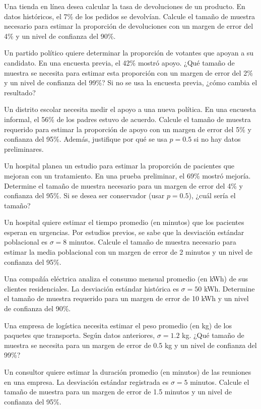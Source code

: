 \documentclass[addpoints,12pt]{exam}
\theoremstyle{plain}
\theoremstyle{remark}
\theoremstyle{definition}
\begin{document}
\begin{questions}
 \question Una tienda en línea desea calcular la tasa de devoluciones de un producto. En datos históricos, el 7\% de los pedidos se devolvían. Calcule el tamaño de muestra necesario para estimar la proporción de devoluciones con un margen de error del 4\% y un nivel de confianza del 90\%.  

 \question Un partido político quiere determinar la proporción de votantes que apoyan a su candidato. En una encuesta previa, el 42\% mostró apoyo. ¿Qué tamaño de muestra se necesita para estimar esta proporción con un margen de error del 2\% y un nivel de confianza del 99\%? Si no se usa la encuesta previa, ¿cómo cambia el resultado?  

 \question Un distrito escolar necesita medir el apoyo a una nueva política. En una encuesta informal, el 56\% de los padres estuvo de acuerdo. Calcule el tamaño de muestra requerido para estimar la proporción de apoyo con un margen de error del 5\% y confianza del 95\%. Además, justifique por qué se usa \( p = 0.5 \) si no hay datos preliminares.  

 \question Un hospital planea un estudio para estimar la proporción de pacientes que mejoran con un tratamiento. En una prueba preliminar, el 69\% mostró mejoría.  Determine el tamaño de muestra necesario para un margen de error del 4\% y confianza del 95\%. Si se desea ser conservador (usar \( p = 0.5 \)), ¿cuál sería el tamaño?  


 \question Un hospital quiere estimar el tiempo promedio (en minutos) que los pacientes esperan en urgencias. Por estudios previos, se sabe que la desviación estándar poblacional es \(\sigma = 8\) minutos. Calcule el tamaño de muestra necesario para estimar la media poblacional con un margen de error de 2 minutos y un nivel de confianza del 95\%.  

 \question  Una compañía eléctrica analiza el consumo mensual promedio (en kWh) de sus clientes residenciales. La desviación estándar histórica es \(\sigma = 50\) kWh.   
Determine el tamaño de muestra requerido para un margen de error de 10 kWh y un nivel de confianza del 90\%.  

 \question Una empresa de logística necesita estimar el peso promedio (en kg) de los paquetes que transporta. Según datos anteriores, \(\sigma = 1.2\) kg. ¿Qué tamaño de muestra se necesita para un margen de error de 0.5 kg y un nivel de confianza del 99\%?  

 \question Un consultor quiere estimar la duración promedio (en minutos) de las reuniones en una empresa. La desviación estándar registrada es \(\sigma = 5\) minutos.  Calcule el tamaño de muestra para un margen de error de 1.5 minutos y un nivel de confianza del 95\%.  


\end{questions}
\end{document}
